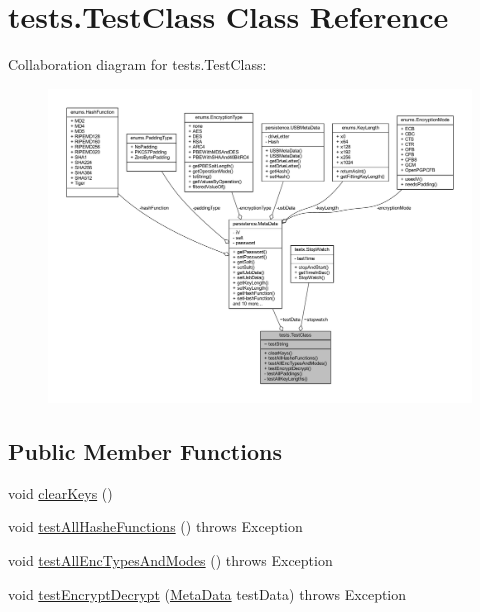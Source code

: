 \hypertarget{classtests_1_1_test_class}{}\section{tests.\+Test\+Class Class Reference}
\label{classtests_1_1_test_class}


Collaboration diagram for tests.\+Test\+Class\+:
\nopagebreak
\begin{figure}[H]
\begin{center}
\leavevmode
\includegraphics[width=350pt]{classtests_1_1_test_class__coll__graph}
\end{center}
\end{figure}
\subsection*{Public Member Functions}
\begin{DoxyCompactItemize}
\item 
void \mbox{\hyperlink{classtests_1_1_test_class_a76d4a21196ec5031baa7c7a42be58cb5}{clear\+Keys}} ()
\item 
void \mbox{\hyperlink{classtests_1_1_test_class_a4f4c0d8502a8a3b322a44e20a5f9cdce}{test\+All\+Hashe\+Functions}} ()  throws Exception 	
\item 
void \mbox{\hyperlink{classtests_1_1_test_class_a85be535c071d279d8d7bc1a40201dcff}{test\+All\+Enc\+Types\+And\+Modes}} ()  throws Exception     
\item 
void \mbox{\hyperlink{classtests_1_1_test_class_a11145228e7254b6763247dcdb84d1805}{test\+Encrypt\+Decrypt}} (\mbox{\hyperlink{classpersistence_1_1_meta_data}{Meta\+Data}} test\+Data)  throws Exception     
\end{DoxyCompactItemize}
